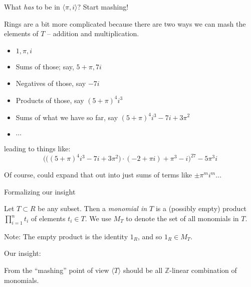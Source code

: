 \documentclass{beamer}
\begin{document}
\begin{frame}{What \emph{has} to be in $\langle \pi, i \rangle $?  Start mashing!}

Rings are a bit more complicated because there are two ways we can mash the elements of $T$ -- addition and multiplication.

\begin{itemize}
\item $1, \pi, i$
\item Sums of those; say, $5+\pi, 7i$
\item Negatives of those, say $-7i$ 
\item Products of those, say $(5+\pi)^4 i^3$
\item Sums of what we have so far, say $(5+\pi)^4i^3-7i+3\pi^2$
\item $\cdots$
\end{itemize}
leading to things like:
$$\Big(\big((5+\pi)^4i^3-7i+3\pi^2\big)\cdot (-2+\pi i)+\pi^3-i\Big)^{27}-5\pi^3i$$

Of course, could expand that out into just sums of terms like $\pm\pi^m i^m$...

\end{frame}

\begin{frame}{Formalizing our insight}

\begin{definition} Let $T\subset R$ be any subset.  Then a \emph{monomial in $T$} is a (possibly empty) product $\prod_{i=1}^n t_i$ of elements $t_i\in T$.  We use $M_T$ to denote the set of all monomials in $T$.
\end{definition}

\begin{block}{Note:}
The empty product is the identity $1_R$, and so $1_R\in M_T$.
\end{block}

\begin{block}{Our insight:}

From the ``mashing'' point of view $\langle T\rangle$ should be all $\mathbb{Z}$-linear combination of monomials.  

\end{block}

\end{frame}
\end{document}
